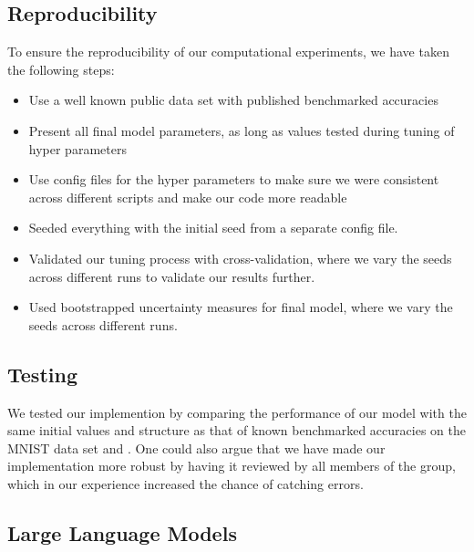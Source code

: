 \subsection{Reproducibility}
To ensure the reproducibility of our computational experiments, we have taken the following steps:
\begin{itemize}
    \item Use a well known public data set with published benchmarked accuracies
    \item Present all final model parameters, as long as values tested during tuning of hyper parameters
    \item Use config files for the hyper parameters to make sure we were consistent across different scripts and make our code more readable
    \item Seeded everything with the initial seed from a separate config file.
    \item Validated our tuning process with cross-validation, where we vary the seeds across different runs to validate our results further. 
    \item Used bootstrapped uncertainty measures for final model, where we vary the seeds across different runs. 
\end{itemize}

\subsection{Testing}
We tested our implemention by comparing the performance of our model with the same initial values and structure as that of known benchmarked accuracies on the MNIST data set \cite{raschka2022machine} and \cite{lecun2015deep}. One could also argue that we have made our implementation more robust by having it reviewed by all members of the group, which in our experience increased the chance of catching errors. 

\subsection{Large Language Models}

